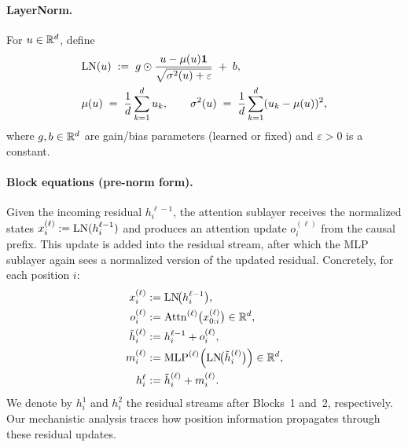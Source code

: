 \documentclass{article}
\theoremstyle{plain}
\theoremstyle{definition}
\theoremstyle{remark}
\begin{document}
\paragraph{LayerNorm.}
For $u\in\mathbb{R}^d$, define
\begin{align}
&\mathrm{LN}(u) \;:=\; g \odot \frac{u - \mu(u)\mathbf{1}}{\sqrt{\sigma^2(u)+\varepsilon}} \;+\; b, \\
&\mu(u) \;=\;\frac{1}{d}\sum_{k=1}^d u_k,\qquad
\sigma^2(u)\;=\;\frac{1}{d}\sum_{k=1}^d (u_k-\mu(u))^2,
\end{align}
where $g,b\in\mathbb{R}^d$ are gain/bias parameters (learned or fixed) and $\varepsilon>0$ is a constant.

\paragraph{Block equations (pre-norm form).}
Given the incoming residual $h_i^{\ell-1}$, the attention sublayer receives the normalized states
$x_i^{(\ell)} := \mathrm{LN}(h_i^{\ell-1})$ and produces an attention update $o_i^{(\ell)}$ from the causal prefix.
This update is added into the residual stream, after which the MLP sublayer again sees a normalized version of the updated residual.
Concretely, for each position $i$:
\begin{align}
x_i^{(\ell)} &:= \mathrm{LN}\!\big(h_i^{\ell-1}\big), \\
o_i^{(\ell)} &:= \operatorname{Attn}^{(\ell)}\!\big(x_{0:i}^{(\ell)}\big)\in\mathbb{R}^d, \\
\tilde h_i^{(\ell)} &:= h_i^{\ell-1} + o_i^{(\ell)}, \\
m_i^{(\ell)} &:= \operatorname{MLP}^{(\ell)}\!\Big(\mathrm{LN}\!\big(\tilde h_i^{(\ell)}\big)\Big)\in\mathbb{R}^d, \\
h_i^{\ell} &:= \tilde h_i^{(\ell)} + m_i^{(\ell)}.
\end{align}
We denote by $h_i^{1}$ and $h_i^{2}$ the residual streams after Blocks~1 and~2, respectively.
Our mechanistic analysis traces how position information propagates through these residual updates.
\end{document}
